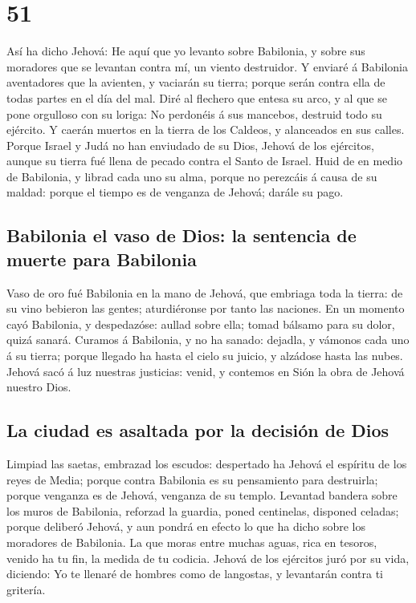 \hypertarget{section-50}{%
\section{51}\label{section-50}}

 Así ha dicho Jehová: He aquí que yo levanto sobre
Babilonia, y sobre sus moradores que se levantan contra mí, un viento
destruidor.  Y enviaré á Babilonia aventadores que la
avienten, y vaciarán su tierra; porque serán contra ella de todas partes
en el día del mal.  Diré al flechero que entesa su arco, y
al que se pone orgulloso con su loriga: No perdonéis á sus mancebos,
destruid todo su ejército.  Y caerán muertos en la tierra de
los Caldeos, y alanceados en sus calles.  Porque Israel y
Judá no han enviudado de su Dios, Jehová de los ejércitos, aunque su
tierra fué llena de pecado contra el Santo de Israel.  Huid
de en medio de Babilonia, y librad cada uno su alma, porque no perezcáis
á causa de su maldad: porque el tiempo es de venganza de Jehová; darále
su pago.

\hypertarget{babilonia-el-vaso-de-dios-la-sentencia-de-muerte-para-babilonia}{%
\subsection{Babilonia el vaso de Dios: la sentencia de muerte para
Babilonia}\label{babilonia-el-vaso-de-dios-la-sentencia-de-muerte-para-babilonia}}

 Vaso de oro fué Babilonia en la mano de Jehová, que
embriaga toda la tierra: de su vino bebieron las gentes; aturdiéronse
por tanto las naciones.  En un momento cayó Babilonia, y
despedazóse: aullad sobre ella; tomad bálsamo para su dolor, quizá
sanará.  Curamos á Babilonia, y no ha sanado: dejadla, y
vámonos cada uno á su tierra; porque llegado ha hasta el cielo su
juicio, y alzádose hasta las nubes.  Jehová sacó á luz
nuestras justicias: venid, y contemos en Sión la obra de Jehová nuestro
Dios.

\hypertarget{la-ciudad-es-asaltada-por-la-decisiuxf3n-de-dios}{%
\subsection{La ciudad es asaltada por la decisión de
Dios}\label{la-ciudad-es-asaltada-por-la-decisiuxf3n-de-dios}}

 Limpiad las saetas, embrazad los escudos: despertado ha
Jehová el espíritu de los reyes de Media; porque contra Babilonia es su
pensamiento para destruirla; porque venganza es de Jehová, venganza de
su templo.  Levantad bandera sobre los muros de Babilonia,
reforzad la guardia, poned centinelas, disponed celadas; porque deliberó
Jehová, y aun pondrá en efecto lo que ha dicho sobre los moradores de
Babilonia.  La que moras entre muchas aguas, rica en
tesoros, venido ha tu fin, la medida de tu codicia.  Jehová
de los ejércitos juró por su vida, diciendo: Yo te llenaré de hombres
como de langostas, y levantarán contra ti gritería.

